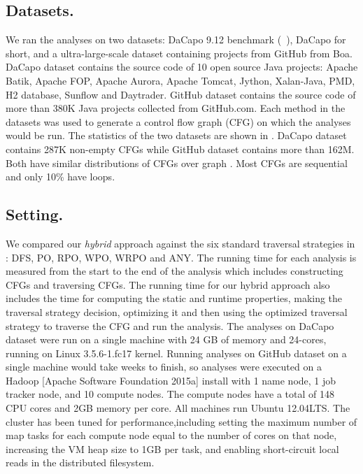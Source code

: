 \subsection{Datasets.} We ran the analyses on two datasets: DaCapo 9.12 benchmark (~\cite{blackburn2006dacapo}), 
DaCapo for short, and a ultra-large-scale dataset containing projects from
GitHub from Boa.
%
DaCapo dataset contains the source code of 10 open source Java projects: 
Apache Batik, Apache FOP, Apache Aurora, Apache Tomcat, Jython, Xalan-Java, 
PMD, H2 database, Sunflow and Daytrader. GitHub dataset contains the 
source code of more than 380K Java projects collected from 
GitHub.com. Each method in the datasets was used to generate a control 
flow graph (CFG) on which the analyses would be run. The statistics of the 
two datasets are shown in . DaCapo dataset contains 
287K non-empty CFGs while GitHub dataset contains more than 162M. Both 
have similar distributions of CFGs over graph \graphprop{}. Most CFGs are sequential 
and only 10\% have loops.

\subsection{Setting.} We compared our \textit{hybrid} approach against the six 
standard traversal strategies in : DFS, PO, RPO, WPO, 
WRPO and ANY. The running time for each analysis is measured from the start 
to the end of the analysis which includes constructing CFGs and traversing 
CFGs. The running time for our hybrid approach also includes the time for 
computing the static and runtime properties, making the traversal strategy 
decision, optimizing it and then using the optimized traversal strategy to 
traverse the CFG and run the analysis.
%
The analyses on DaCapo dataset were run on  a single machine with 24 GB of 
memory and 24-cores, running on Linux 3.5.6-1.fc17 kernel. Running analyses 
on GitHub dataset on a single machine would take weeks to finish, so analyses were executed on a Hadoop [Apache Software Foundation 2015a] install with 1 name node, 1 job tracker node, and 10 compute nodes. The compute nodes have a total of 148 CPU cores and 2GB memory per core. All machines run Ubuntu 12.04LTS. The cluster has been tuned for performance,including setting the maximum number of map tasks for each compute node equal to the number of cores on that node, increasing the VM heap size to 1GB per task, and enabling short-circuit local reads in the distributed filesystem.

